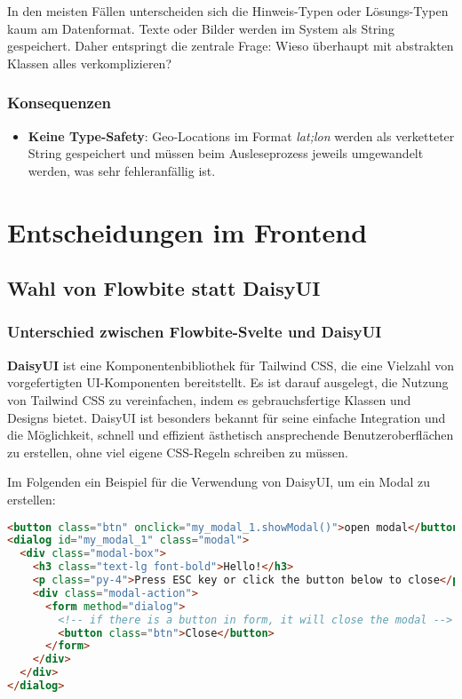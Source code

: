 In den meisten Fällen unterscheiden sich die Hinweis-Typen oder Lösungs-Typen kaum am Datenformat. Texte oder Bilder werden im System als String gespeichert. Daher entspringt die zentrale Frage: Wieso überhaupt mit abstrakten Klassen alles verkomplizieren?

\subsubsection{Konsequenzen}

\begin{itemize}
    \item \textbf{Keine Type-Safety}: Geo-Locations im Format \textit{lat;lon} werden als verketteter String gespeichert und müssen beim Ausleseprozess jeweils umgewandelt werden, was sehr fehleranfällig ist.
\end{itemize}

\section{Entscheidungen im Frontend}

\subsection{Wahl von Flowbite statt DaisyUI} \label{appendix:adr:daisy}

\subsubsection{Unterschied zwischen Flowbite-Svelte und DaisyUI}

\textbf{DaisyUI} ist eine Komponentenbibliothek für Tailwind CSS, die eine Vielzahl von vorgefertigten UI-Komponenten bereitstellt. Es ist darauf ausgelegt, die Nutzung von Tailwind CSS zu vereinfachen, indem es gebrauchsfertige Klassen und Designs bietet. DaisyUI ist besonders bekannt für seine einfache Integration und die Möglichkeit, schnell und effizient ästhetisch ansprechende Benutzeroberflächen zu erstellen, ohne viel eigene CSS-Regeln schreiben zu müssen. 

Im Folgenden ein Beispiel für die Verwendung von DaisyUI, um ein Modal zu erstellen:

\begin{lstlisting}[language=html, caption={Code Ausschnitt DaisyUI Beispiel}]
<button class="btn" onclick="my_modal_1.showModal()">open modal</button>
<dialog id="my_modal_1" class="modal">
  <div class="modal-box">
    <h3 class="text-lg font-bold">Hello!</h3>
    <p class="py-4">Press ESC key or click the button below to close</p>
    <div class="modal-action">
      <form method="dialog">
        <!-- if there is a button in form, it will close the modal -->
        <button class="btn">Close</button>
      </form>
    </div>
  </div>
</dialog>
\end{lstlisting}

